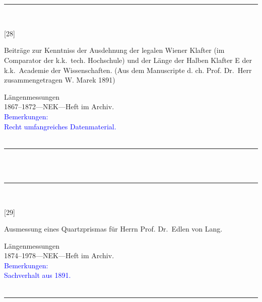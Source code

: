 \\
\vspace*{-2.5pt}\\
\parbox{\textwidth}{%
\rule{\textwidth}{1pt}\vspace*{-3mm}\\
\begin{minipage}[t]{0.15\textwidth}\vspace{0pt}
\Huge\rule[-4mm]{0cm}{1cm}[28]
\end{minipage}
\hfill
\begin{minipage}[t]{0.85\textwidth}\vspace{0pt}
\large Beiträge zur Kenntniss der Ausdehnung der legalen Wiener Klafter (im Comparator der k.k.\ tech. Hochschule) und der Länge der Halben Klafter {\glqq}E{\grqq} der k.k.\ Academie der Wissenschaften. (Aus dem Manuscripte d. ch. Prof. Dr.~Herr zusammengetragen W. Marek 1891)\rule[-2mm]{0mm}{2mm}
\end{minipage}
{\footnotesize\flushright
Längenmessungen\\
}
1867--1872\quad---\quad NEK\quad---\quad Heft im Archiv.\\
\textcolor{blue}{Bemerkungen:\\{}
Recht umfangreiches Datenmaterial.\\{}
}
\\[-15pt]
\rule{\textwidth}{1pt}
}
\\
\vspace*{-2.5pt}\\
\parbox{\textwidth}{%
\rule{\textwidth}{1pt}\vspace*{-3mm}\\
\begin{minipage}[t]{0.15\textwidth}\vspace{0pt}
\Huge\rule[-4mm]{0cm}{1cm}[29]
\end{minipage}
\hfill
\begin{minipage}[t]{0.85\textwidth}\vspace{0pt}
\large Ausmessung eines Quartzprismas für Herrn Prof. Dr.~Edlen von Lang.\rule[-2mm]{0mm}{2mm}
\end{minipage}
{\footnotesize\flushright
Längenmessungen\\
}
1874--1978\quad---\quad NEK\quad---\quad Heft im Archiv.\\
\textcolor{blue}{Bemerkungen:\\{}
Sachverhalt aus 1891.\\{}
}
\\[-15pt]
\rule{\textwidth}{1pt}
}
